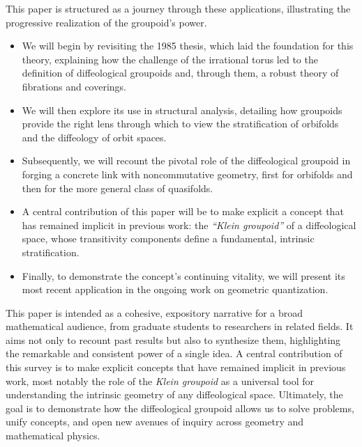 \documentclass[10pt,reqno,letterpaper,twoside]{amsart}
\theoremstyle{article}
\begin{document}
  This paper is structured as a journey through these applications,
  illustrating the progressive realization of the groupoid's power.
  \begin{itemize}
    \item[--] We will begin by revisiting the 1985 thesis,
    which laid the foundation for this theory,
    explaining how the challenge of the irrational torus led to the definition of diffeological groupoids and,
    through them,
    a robust theory of fibrations and coverings.
    \item[--] We will then explore its use in structural analysis,
    detailing how groupoids provide the right lens through which to view the stratification of orbifolds and the diffeology of orbit spaces.
    \item[--] Subsequently,
    we will recount the pivotal role of the diffeological groupoid in forging a concrete link with noncommutative geometry,
    first for orbifolds and then for the more general class of quasifolds.
    \item[--] A central contribution of this paper will be to make explicit a concept that has remained implicit in previous work:
    the \emph{``Klein groupoid''} of a diffeological space,
    whose transitivity components define a fundamental, intrinsic stratification.
    \item[--] Finally,
    to demonstrate the concept's continuing vitality,
    we will present its most recent application in the ongoing work on geometric quantization.
  \end{itemize}
  
  This paper is intended as a cohesive,
  expository narrative for a broad mathematical audience,
  from graduate students to researchers in related fields.
  It aims not only to recount past results but also to synthesize them,
  highlighting the remarkable and consistent power of a single idea.
  A central contribution of this survey is to make explicit concepts that have remained implicit in previous work,
  most notably the role of the \emph{Klein groupoid} as a universal tool for understanding the intrinsic geometry of any diffeological space.
  Ultimately,
  the goal is to demonstrate how the diffeological groupoid allows us to solve problems,
  unify concepts,
  and open new avenues of inquiry across geometry and mathematical physics.
  
  
\end{document}
